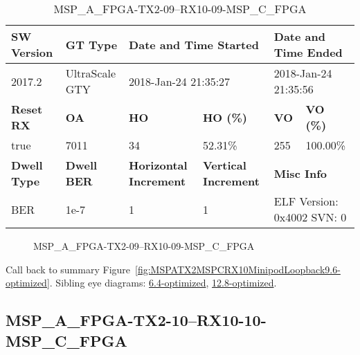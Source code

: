 \begin{table}[h]
\centering
\caption{MSP\_A\_FPGA-TX2-09--RX10-09-MSP\_C\_FPGA}
\label{tab:MSPAFPGATX209RX1009MSPCFPGA9.6-optimized}
\begin{tabular}{@{}|l|l|l|l|l|l|@{}}
\toprule
\textbf{SW Version}                & \textbf{GT Type}   & \multicolumn{2}{l|}{\textbf{Date and Time Started}}            & \multicolumn{2}{l|}{\textbf{Date and Time Ended}}        \\ \midrule
2017.2                       & UltraScale GTY          & \multicolumn{2}{l|}{2018-Jan-24 21:35:27}                   & \multicolumn{2}{l|}{2018-Jan-24 21:35:56}               \\ \midrule
\textbf{Reset RX}                  & \textbf{OA} & \textbf{HO}   & \textbf{HO (\%)} & \textbf{VO} & \textbf{VO (\%)} \\ \midrule
true & 7011        & 34          & 52.31\%        & 255        & 100.00\%       \\ \midrule
\textbf{Dwell Type}                & \textbf{Dwell BER} & \textbf{Horizontal Increment} & \textbf{Vertical Increment}    & \multicolumn{2}{l|}{\textbf{Misc Info}}                  \\ \midrule
BER                            & 1e-7        & 1        & 1           & \multicolumn{2}{l|}{ELF Version: 0x4002 SVN: 0}                         \\ \bottomrule
\end{tabular}
\end{table}

\begin{figure}[h]
\caption{MSP\_A\_FPGA-TX2-09--RX10-09-MSP\_C\_FPGA} \label{fig:MSPAFPGATX209RX1009MSPCFPGA9.6-optimized}
\end{figure}

Call back to summary Figure~\ref{fig:MSPATX2MSPCRX10MinipodLoopback9.6-optimized}.
Sibling eye diagrams: \hyperref[sec:MSPAFPGATX209RX1009MSPCFPGA6.4-optimized]{6.4-optimized}, \hyperref[sec:MSPAFPGATX209RX1009MSPCFPGA12.8-optimized]{12.8-optimized}.

\clearpage
\newpage


\subsection{MSP\_A\_FPGA-TX2-10--RX10-10-MSP\_C\_FPGA}\label{sec:MSPAFPGATX210RX1010MSPCFPGA9.6-optimized}

